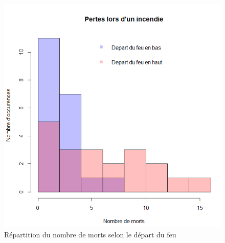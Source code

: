 \documentclass[10pt]{beamer}
\begin{document}
\begin{frame}
\begin{columns}
			\begin{figure}
				\includegraphics[width=\linewidth]{graphe_nb_mort.PNG}
 				\caption{Répartition du nombre de morts selon le départ du feu}
 				\label{pic: feu2}
 			\end{figure}

	\end{columns}
	
\end{frame}
\end{document}
